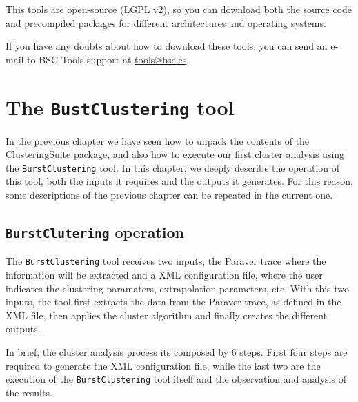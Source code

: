 \documentclass[twoside,a4,english,11pt]{book}
\begin{document}
This tools are open-source (LGPL v2), so you can download both the source code
and precompiled packages for different architectures and operating systems.

If you have any doubts about how to download these tools, you can send
an e-mail to BSC Tools support at \href{mailto:tools@bsc.es}{tools@bsc.es}.

\chapter{The \texttt{BustClustering} tool}

In the previous chapter we have seen how to unpack the contents of the
\textsf{ClusteringSuite} package, and also how to execute our first cluster
analysis using the \texttt{BurstClustering} tool. In this chapter, we deeply
describe the operation of this tool, both the inputs it requires and the
outputs it generates. For this reason, some descriptions of the previous
chapter can be repeated in the current one.

\section{\texttt{BurstClutering} operation}

The \texttt{BurstClustering} tool receives two inputs, the Paraver trace where
the information will be extracted and a XML configuration file, where the
user indicates the clustering paramaters, extrapolation parameters, etc. With
this two inputs, the tool first extracts the data from the Paraver trace,
as defined in the XML file, then applies the cluster algorithm and finally
creates the different outputs.

% 

In brief, the cluster analysis process its composed by 6 steps. First four
steps are required to generate the XML configuration file, while the
last two are the execution of the \texttt{BurstClustering} tool itself and
the observation and analysis of the results.
\end{document}
